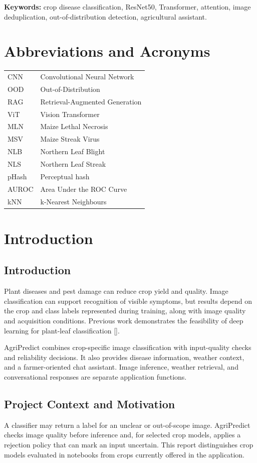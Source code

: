 \documentclass[12pt,a4paper,oneside]{report}
\begin{document}
\noindent\textbf{Keywords:} crop disease classification, ResNet50, Transformer, attention, image deduplication, out-of-distribution detection, agricultural assistant.
\tableofcontents\listoffigures\listoftables
\chapter*{Abbreviations and Acronyms}
\begin{longtable}{ll}CNN & Convolutional Neural Network\\OOD & Out-of-Distribution\\RAG & Retrieval-Augmented Generation\\ViT & Vision Transformer\\MLN & Maize Lethal Necrosis\\MSV & Maize Streak Virus\\NLB & Northern Leaf Blight\\NLS & Northern Leaf Streak\\pHash & Perceptual hash\\AUROC & Area Under the ROC Curve\\kNN & k-Nearest Neighbours\end{longtable}
\clearpage{}

\chapter{Introduction}
\section{Introduction}
Plant diseases and pest damage can reduce crop yield and quality. Image classification can support recognition of visible symptoms, but results depend on the crop and class labels represented during training, along with image quality and acquisition conditions. Previous work demonstrates the feasibility of deep learning for plant-leaf classification [\cite{hughes2015,mohanty2016}].

AgriPredict combines crop-specific image classification with input-quality checks and reliability decisions. It also provides disease information, weather context, and a farmer-oriented chat assistant. Image inference, weather retrieval, and conversational responses are separate application functions.
\section{Project Context and Motivation}
A classifier may return a label for an unclear or out-of-scope image. AgriPredict checks image quality before inference and, for selected crop models, applies a rejection policy that can mark an input uncertain. This report distinguishes crop models evaluated in notebooks from crops currently offered in the application.
\end{document}
